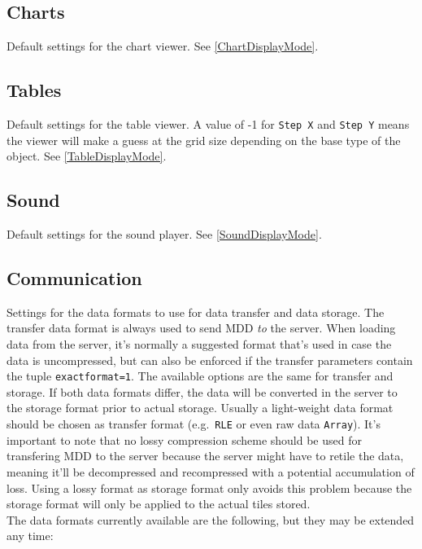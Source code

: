 \documentclass[11pt]{article}
\begin{document}
\subsection{Charts}
Default settings for the chart viewer. See \ref{ChartDisplayMode}.

\subsection{Tables}
Default settings for the table viewer. A value of -1 for \texttt{Step X} and \texttt{Step Y}
means the viewer will make a guess at the grid size depending on the base type of the
object. See \ref{TableDisplayMode}.

\subsection{Sound}
Default settings for the sound player. See \ref{SoundDisplayMode}.

\subsection{Communication}

Settings for the data formats to use for data transfer and data storage. The
transfer data format is always used to send MDD \emph{to} the server. When
loading data from the server, it's normally a suggested format that's used
in case the data is uncompressed, but can also be enforced if the transfer
parameters contain the tuple \texttt{exactformat=1}. The available options are 
the same for transfer and storage. If both data formats differ, the data
will be converted in the server to the storage format prior to actual
storage. Usually a light-weight data format should be chosen as transfer
format (e.g.\ \texttt{RLE} or even raw data \texttt{Array}). It's important to
note that no lossy compression scheme should be used for transfering MDD
to the server because the server might have to retile the data, meaning
it'll be decompressed and recompressed with a potential accumulation of
loss. Using a lossy format as storage format only avoids this problem
because the storage format will only be applied to the actual tiles
stored.\\
The data formats currently available are the following, but they may be extended
any time:
\end{document}
